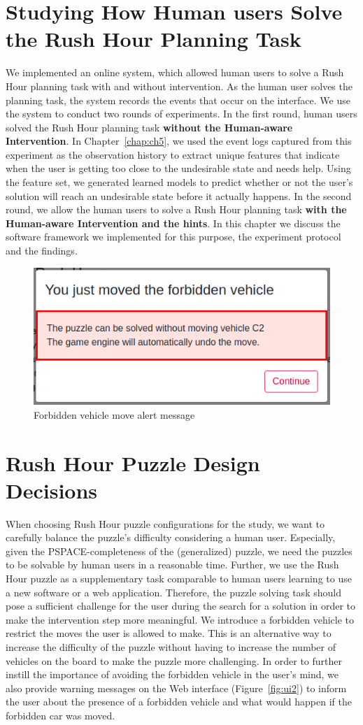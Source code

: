 \section{Studying How Human users Solve the Rush Hour Planning Task}
We implemented an online system, which allowed human users to solve a Rush Hour planning task with and without intervention. 
As the human user solves the planning task, the system records the events that occur on the interface.
We use the system to conduct two rounds of experiments.
In the first round, human users solved the Rush Hour planning task \textbf{without the Human-aware Intervention}.
In Chapter~\ref{chap:ch5}, we used the event logs captured from this experiment as the observation history \historyDef to extract unique features that indicate when the user is getting too close to the undesirable state and needs help. 
Using the feature set, we generated learned models to predict whether or not the user's solution will reach an undesirable state before it actually happens. 
In the second round, we allow the human users to solve a Rush Hour planning task \textbf{with the Human-aware Intervention and the hints}.
In this chapter we discuss the software framework we implemented for this purpose, the experiment protocol and the findings.

\begin{figure}[tpb]
  \centering
  \includegraphics[width=0.5\columnwidth, keepaspectratio=true]{img/badcaralert.png}
  \caption{Forbidden vehicle move alert message}
  \label{fig:badcar}
\end{figure}

\section{Rush Hour Puzzle Design Decisions}
When choosing Rush Hour puzzle configurations for the study, we want to carefully balance the puzzle's difficulty considering a human user. 
Especially, given the PSPACE-completeness of the (generalized) puzzle, we need the puzzles to be solvable by human users in a reasonable time. 
Further, we use the Rush Hour puzzle as a supplementary task comparable to human users learning to use a new software or a web application. 
Therefore, the puzzle solving task should pose a sufficient challenge for the user during the search for a solution in order to make the intervention step more meaningful. We introduce a forbidden vehicle to restrict the moves the user is allowed to make. 
This is an alternative way to increase the difficulty of the puzzle without having to increase the number of vehicles on the board \cite{fernau2003} to make the puzzle more challenging.
In order to further instill the importance of avoiding the forbidden vehicle in the user's mind, we also provide warning messages on the Web interface (Figure~\ref{fig:ui2}) to inform the user about the presence of a forbidden vehicle and what would happen if the forbidden car was moved. 

